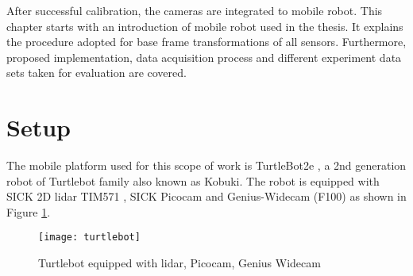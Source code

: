 After successful calibration, the cameras are integrated to mobile robot. This chapter starts with an introduction of mobile robot used in the thesis. It explains the procedure adopted for base frame transformations of all sensors. Furthermore, proposed implementation, data acquisition process and different experiment data sets taken for evaluation are covered.

\section{Setup}
The mobile platform used for this scope of work is TurtleBot2e \cite{turtlebot2}, a 2nd generation robot of Turtlebot family also known as Kobuki. The robot is equipped with SICK 2D \acrshort{lidar} TIM571 \cite{sick}, SICK Picocam and Genius-Widecam (F100) as shown in Figure \ref{fig:turtlebot}.
\begin{figure}[H]
	\centering
	\texttt{[image: turtlebot]}
	\caption{Turtlebot equipped with \acrshort{lidar}, Picocam, Genius Widecam}
	\label{fig:turtlebot}
\end{figure}
